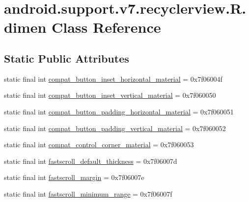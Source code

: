 \hypertarget{classandroid_1_1support_1_1v7_1_1recyclerview_1_1R_1_1dimen}{}\section{android.\+support.\+v7.\+recyclerview.\+R.\+dimen Class Reference}
\label{classandroid_1_1support_1_1v7_1_1recyclerview_1_1R_1_1dimen}
\subsection*{Static Public Attributes}
\begin{DoxyCompactItemize}
\item 
static final int \mbox{\hyperlink{classandroid_1_1support_1_1v7_1_1recyclerview_1_1R_1_1dimen_a242057186bc8580665bf783a2675ee16}{compat\+\_\+button\+\_\+inset\+\_\+horizontal\+\_\+material}} = 0x7f06004f
\item 
static final int \mbox{\hyperlink{classandroid_1_1support_1_1v7_1_1recyclerview_1_1R_1_1dimen_af6caf09e4e348978fd7154fb932179fb}{compat\+\_\+button\+\_\+inset\+\_\+vertical\+\_\+material}} = 0x7f060050
\item 
static final int \mbox{\hyperlink{classandroid_1_1support_1_1v7_1_1recyclerview_1_1R_1_1dimen_a43e5d15da88fb29ec52e9a3d1ab113a0}{compat\+\_\+button\+\_\+padding\+\_\+horizontal\+\_\+material}} = 0x7f060051
\item 
static final int \mbox{\hyperlink{classandroid_1_1support_1_1v7_1_1recyclerview_1_1R_1_1dimen_ae169af4665af04304ea29edbf7cf2203}{compat\+\_\+button\+\_\+padding\+\_\+vertical\+\_\+material}} = 0x7f060052
\item 
static final int \mbox{\hyperlink{classandroid_1_1support_1_1v7_1_1recyclerview_1_1R_1_1dimen_a76bc121038af3011a668454c65779de0}{compat\+\_\+control\+\_\+corner\+\_\+material}} = 0x7f060053
\item 
static final int \mbox{\hyperlink{classandroid_1_1support_1_1v7_1_1recyclerview_1_1R_1_1dimen_a85f67c45c2a8415cc540f4aab28693fe}{fastscroll\+\_\+default\+\_\+thickness}} = 0x7f06007d
\item 
static final int \mbox{\hyperlink{classandroid_1_1support_1_1v7_1_1recyclerview_1_1R_1_1dimen_af1adda40f7e92e9ad3ed9b8af59b9ad7}{fastscroll\+\_\+margin}} = 0x7f06007e
\item 
static final int \mbox{\hyperlink{classandroid_1_1support_1_1v7_1_1recyclerview_1_1R_1_1dimen_af0f89a5e5f3dd7abaf4f4b903528e54a}{fastscroll\+\_\+minimum\+\_\+range}} = 0x7f06007f

\end{DoxyCompactItemize}
